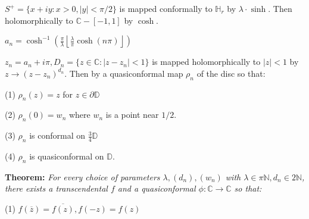 \documentclass{beamer}
\begin{document}
\begin{frame} 

{\tiny $S^+ = \{ x + iy : x > 0, |y| < \pi/2 \}$ is mapped conformally to $\mathbb{H}_r$ by $\lambda\cdot\sinh$. Then holomorphically to $\mathbb{C} - [-1,1]$ by $\cosh$.

\vspace{1.25mm}

$a_n = \cosh^{-1}\left( \frac{\pi}{\lambda} \left \lfloor{ \frac{\lambda}{\pi} \cosh(n\pi) }\right \rfloor \right)$

\vspace{1.25mm}

$z_n = a_n + i\pi, D_n = \{ z \in \mathbb{C} : \left| z - z_n \right| < 1\} $ is mapped holomorphically to $|z|<1$ by $z\rightarrow (z - z_n)^{d_n}$. Then by a quasiconformal map $\rho_n$ of the disc so that: 

\hspace{5mm} (1) $\rho_n(z)=z$ for $z\in\partial\mathbb{D}$

\hspace{5mm} (2) $\rho_n(0)=w_n$ where $w_n$ is a point near $1/2$.

\hspace{5mm} (3) $\rho_n$ is conformal on $\frac{3}{4}\mathbb{D}$

\hspace{5mm} (4) $\rho_n$ is quasiconformal on $\mathbb{D}$.  

}

\vspace{5mm}

{\bf Theorem:}  {\it For every choice of parameters $\lambda, (d_n), (w_n)$ with $\lambda \in \pi\mathbb{N}, d_n \in 2\mathbb{N}$, there exists a transcendental $f$ and a quasiconformal $\phi: \mathbb{C}\rightarrow\mathbb{C}$ so that:}

\hspace{5mm} (1) $f(\overline{z}) = \overline{f(z)}, f(-z)=f(z)$


\end{frame}
\end{document}
